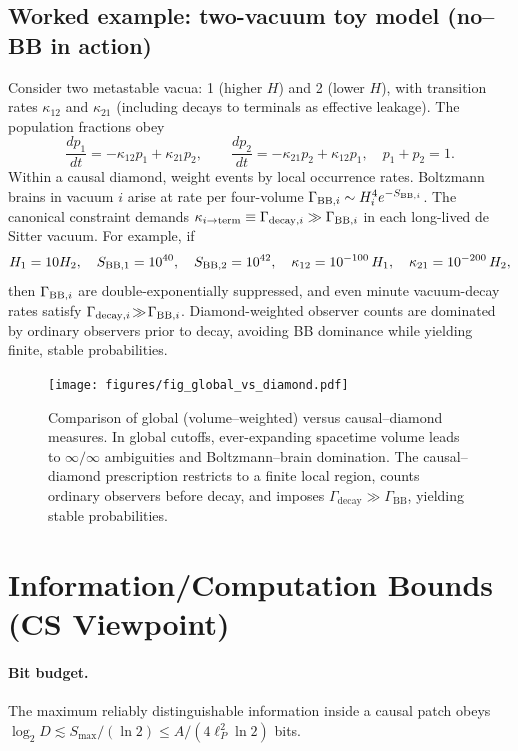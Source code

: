 \documentclass[12pt]{article}
\newcommand{\Smax}{S_{\max}}
\theoremstyle{remark}
\begin{document}
\subsection*{Worked example: two-vacuum toy model (no--BB in action)}
Consider two metastable vacua: 1 (higher $H$) and 2 (lower $H$), with transition rates $\kappa_{12}$ and $\kappa_{21}$ (including decays to terminals as effective leakage). The population fractions obey
\begin{equation}
 \frac{dp_1}{dt}= -\kappa_{12} p_1 + \kappa_{21} p_2,\qquad \frac{dp_2}{dt}= -\kappa_{21} p_2 + \kappa_{12} p_1,\quad p_1{+}p_2=1.
\end{equation}
Within a causal diamond, weight events by local occurrence rates. Boltzmann brains in vacuum $i$ arise at rate per four-volume $\Gamma_{{\rm BB},i}\sim H_i^4 e^{-S_{{\rm BB},i}}$. The canonical constraint demands $\kappa_{i\to{\rm term}}\equiv \Gamma_{{\rm decay},i} \gg \Gamma_{{\rm BB},i}$ in each long-lived de Sitter vacuum. For example, if
\[
 H_1=10 H_2,\quad S_{{\rm BB},1}=10^{40},\quad S_{{\rm BB},2}=10^{42},\quad \kappa_{12}=10^{-100}\,H_1,\quad \kappa_{21}=10^{-200}\,H_2,
\]
then $\Gamma_{{\rm BB},i}$ are double-exponentially suppressed, and even minute vacuum-decay rates satisfy $\Gamma_{{\rm decay},i}\!\gg\!\Gamma_{{\rm BB},i}$. Diamond-weighted observer counts are dominated by ordinary observers prior to decay, avoiding BB dominance while yielding finite, stable probabilities.

\begin{figure}[t]
  \centering
  \texttt{[image: figures/fig\_global\_vs\_diamond.pdf]}
  \caption{Comparison of global (volume–weighted) versus causal–diamond measures. 
  In global cutoffs, ever-expanding spacetime volume leads to $\infty/\infty$ ambiguities 
  and Boltzmann–brain domination. 
  The causal–diamond prescription restricts to a finite local region, 
  counts ordinary observers before decay, and imposes 
  $\Gamma_{\mathrm{decay}} \gg \Gamma_{\mathrm{BB}}$, yielding stable probabilities.}
  \label{fig:global-vs-diamond}
\end{figure}

\section{Information/Computation Bounds (CS Viewpoint)}
\paragraph{Bit budget.} The maximum reliably distinguishable information inside a causal patch obeys $\log_2 D \lesssim \Smax/(\ln 2) \le A/(4\ell_P^2\ln 2)$ bits.
\end{document}
